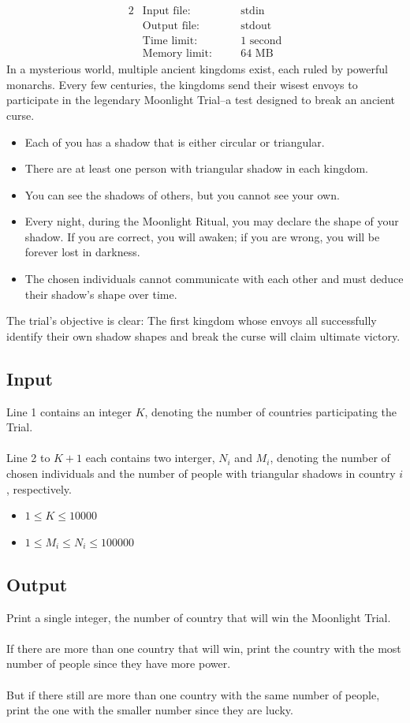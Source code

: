 \documentclass[12pt,a4paper]{article}
\begin{document}
\begin{alignat*} {2}
 &   \text{Input file:}   \quad     &&\text{stdin}\\
 &   \text{Output file:}  \quad     &&\text{stdout}\\
 &   \text{Time limit:}   \quad     &&\text{1 second}\\
 &   \text{Memory limit:} \quad     &&\text{64 MB}
\end{alignat*}
\noindent
In a mysterious world, multiple ancient kingdoms exist, each ruled by powerful monarchs. Every few centuries, the kingdoms send their wisest envoys to participate in the legendary Moonlight Trial--a test designed to break an ancient curse.
\begin{itemize}
    \item Each of you has a shadow that is either circular or triangular.
    \item There are at least one person with triangular shadow in each kingdom.
    \item You can see the shadows of others, but you cannot see your own.
    \item Every night, during the Moonlight Ritual, you may declare the shape of your shadow. If you are correct, you will awaken; if you are wrong, you will be forever lost in darkness.
    \item The chosen individuals cannot communicate with each other and must deduce their shadow's shape over time.  
\end{itemize}
\noindent
The trial's objective is clear:
The first kingdom whose envoys all successfully identify their own shadow shapes and break the curse will claim ultimate victory.

\subsection*{\fontsize{16}{12}Input}
Line 1 contains an integer $K$, denoting the number of countries participating the Trial.
\\\\
\noindent
Line 2 to $K + 1$ each contains two interger, $N_i$ and $M_i$, denoting the number of chosen individuals and the number of people with triangular shadows in country $i$, respectively.
\begin{itemize}
    \item $1 \leq K \leq 10000$
    \item $1 \leq M_i \leq N_i \leq 100000$
\end{itemize}
\subsection*{\fontsize{16}{12}Output}
Print a single integer, the number of country that will win the Moonlight Trial. 
\\\\
\noindent
If there are more than one country that will win, print the country with the most number of people since they have more power. 
\\\\
\noindent
But if there still are more than one country with the same number of people, print the one with the smaller number since they are lucky.
\end{document}
